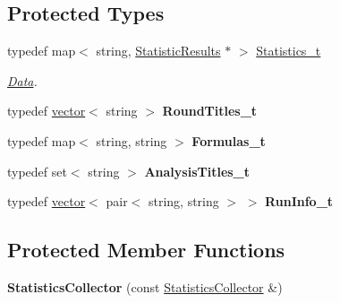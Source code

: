 \subsection*{Protected Types}
\begin{DoxyCompactItemize}
\item 
\hypertarget{classStatisticsCollector_a77c98fe0b4aa668ad5377e8302ec1c1f}{}typedef map$<$ string, \hyperlink{structStatisticsCollector_1_1StatisticResults}{Statistic\+Results} $\ast$ $>$ \hyperlink{classStatisticsCollector_a77c98fe0b4aa668ad5377e8302ec1c1f}{Statistics\+\_\+t}\label{classStatisticsCollector_a77c98fe0b4aa668ad5377e8302ec1c1f}

\begin{DoxyCompactList}\small\item\em \hyperlink{classData}{Data}. \end{DoxyCompactList}\item 
\hypertarget{classStatisticsCollector_a844b1a3ba5df79bcb87607dcab93f7a2}{}typedef \hyperlink{structvector}{vector}$<$ string $>$ {\bfseries Round\+Titles\+\_\+t}\label{classStatisticsCollector_a844b1a3ba5df79bcb87607dcab93f7a2}

\item 
\hypertarget{classStatisticsCollector_ae3f2cc843f0da322e475a9ddf09bde80}{}typedef map$<$ string, string $>$ {\bfseries Formulas\+\_\+t}\label{classStatisticsCollector_ae3f2cc843f0da322e475a9ddf09bde80}

\item 
\hypertarget{classStatisticsCollector_a96ed6cae70870195f8c7c69ca7bf8649}{}typedef set$<$ string $>$ {\bfseries Analysis\+Titles\+\_\+t}\label{classStatisticsCollector_a96ed6cae70870195f8c7c69ca7bf8649}

\item 
\hypertarget{classStatisticsCollector_a7b28915a836bb45daec085000b8b8eb6}{}typedef \hyperlink{structvector}{vector}$<$ pair$<$ string, string $>$ $>$ {\bfseries Run\+Info\+\_\+t}\label{classStatisticsCollector_a7b28915a836bb45daec085000b8b8eb6}

\end{DoxyCompactItemize}
\subsection*{Protected Member Functions}
\begin{DoxyCompactItemize}
\item 
\hypertarget{classStatisticsCollector_ad6fac79d8f2bb56e7c063da9c78886e4}{}{\bfseries Statistics\+Collector} (const \hyperlink{classStatisticsCollector}{Statistics\+Collector} \&)\label{classStatisticsCollector_ad6fac79d8f2bb56e7c063da9c78886e4}

\end{DoxyCompactItemize}

